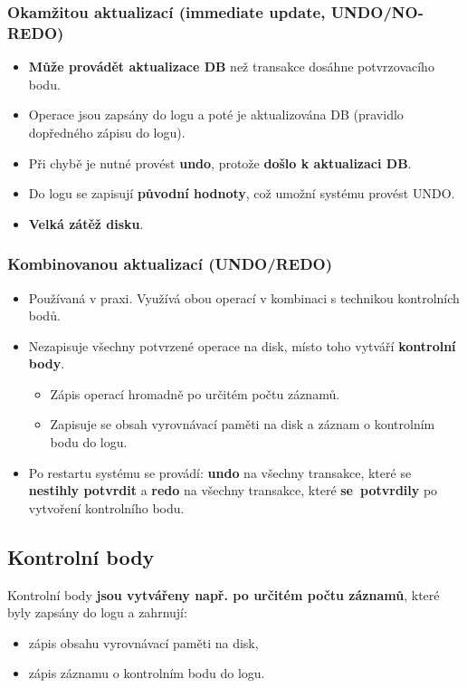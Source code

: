 \subsubsection*{Okamžitou aktualizací (immediate update, UNDO/NO-REDO)}
\begin{itemize}
\item \textbf{Může provádět aktualizace DB} než transakce dosáhne potvrzovacího bodu.
\item Operace jsou zapsány do logu a poté je aktualizována DB (pravidlo dopředného zápisu do logu).
\item Při chybě je nutné provést \textbf{undo}, protože \textbf{došlo k aktualizaci DB}.
\item Do logu se zapisují \textbf{původní hodnoty}, což umožní systému provést UNDO.
\item \textbf{Velká zátěž disku}.
\end{itemize}
\subsubsection*{Kombinovanou aktualizací (UNDO/REDO)}
\begin{itemize}
\item Používaná v praxi. Využívá obou operací v kombinaci s technikou kontrolních bodů.
\item Nezapisuje všechny potvrzené operace na disk, místo toho vytváří \textbf{kontrolní body}.
\begin{itemize}
\item Zápis operací hromadně po určitém počtu záznamů.
\item Zapisuje se obsah vyrovnávací paměti na disk a záznam o kontrolním bodu do logu.
\end{itemize}
\item Po restartu systému se provádí: \textbf{undo} na všechny transakce, které se \textbf{nestihly potvrdit} a \textbf{redo} na všechny transakce, které \textbf{se potvrdily} po vytvoření kontrolního bodu.
\end{itemize}

\subsection{Kontrolní body}
Kontrolní body \textbf{jsou vytvářeny např. po určitém počtu záznamů}, které byly zapsány do logu a zahrnují:
\begin{itemize}
\item zápis obsahu vyrovnávací paměti na disk,
\item zápis záznamu o kontrolním bodu do logu.
\end{itemize}

